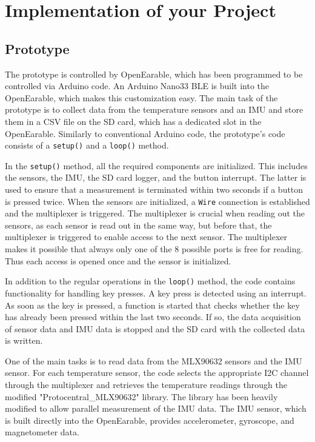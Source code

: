 \chapter{Implementation of your Project}
\label{ch:Implementation}

\section{Prototype}

The prototype is controlled by OpenEarable, which has been programmed to be controlled via Arduino code. An Arduino Nano33 BLE is built into the OpenEarable, which makes this customization easy. The main task of the prototype is to collect data from the temperature sensors and an IMU and store them in a CSV file on the SD card, which has a dedicated slot in the OpenEarable. Similarly to conventional Arduino code, the prototype's code consists of a \texttt{setup()} and a \texttt{loop()} method.

In the \texttt{setup()} method, all the required components are initialized. This includes the sensors, the IMU, the SD card logger, and the button interrupt. The latter is used to ensure that a measurement is terminated within two seconds if a button is pressed twice. When the sensors are initialized, a \texttt{Wire} connection is established and the multiplexer is triggered. The multiplexer is crucial when reading out the sensors, as each sensor is read out in the same way, but before that, the multiplexer is triggered to enable access to the next sensor. The multiplexer makes it possible that always only one of the 8 possible ports is free for reading. Thus each access is opened once and the sensor is initialized.

In addition to the regular operations in the \texttt{loop()} method, the code contains functionality for handling key presses. A key press is detected using an interrupt. As soon as the key is pressed, a function is started that checks whether the key has already been pressed within the last two seconds. If so, the data acquisition of sensor data and IMU data is stopped and the SD card with the collected data is written.

One of the main tasks is to read data from the MLX90632 sensors and the IMU sensor. For each temperature sensor, the code selects the appropriate I2C channel through the multiplexer and retrieves the temperature readings through the modified "Protocentral\_MLX90632" library. The library has been heavily modified to allow parallel measurement of the IMU data. The IMU sensor, which is built directly into the OpenEarable, provides accelerometer, gyroscope, and magnetometer data.

